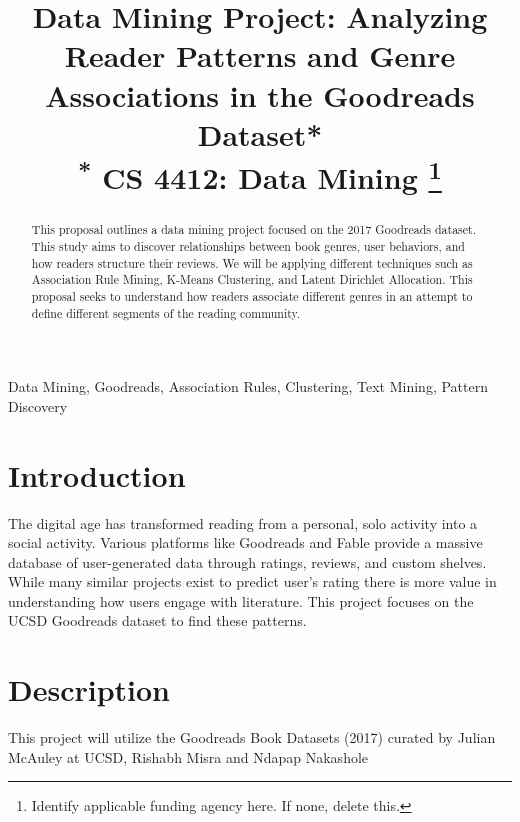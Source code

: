 \documentclass[conference]{IEEEtran}
\begin{document}
\title{Data Mining Project: Analyzing Reader Patterns and Genre Associations in the Goodreads Dataset*\\
{\footnotesize \textsuperscript{*}
CS 4412: Data Mining}
\thanks{Identify applicable funding agency here. If none, delete this.}
}

\author{

}



\begin{abstract}
This proposal outlines a data mining project focused on the 2017 Goodreads dataset. This study aims to discover relationships between book genres, user behaviors, and how readers structure their reviews. We will be applying different techniques such as Association Rule Mining, K-Means Clustering, and Latent Dirichlet Allocation. This proposal seeks to understand how readers associate different genres in an attempt to define different segments of the reading community.
\end{abstract}

\begin{IEEEkeywords}
Data Mining, Goodreads, Association Rules, Clustering, Text Mining, Pattern Discovery
\end{IEEEkeywords}

\section{Introduction}
The digital age has transformed reading from a personal, solo activity into a social activity. Various platforms like Goodreads and Fable provide a massive database of user-generated data through ratings, reviews, and custom shelves. While many similar projects exist to predict user's rating there is more value in understanding how users engage with literature. This project focuses on the UCSD Goodreads dataset to find these patterns.

\section{Description}
This project will utilize the Goodreads Book Datasets (2017) curated by Julian McAuley at UCSD, Rishabh Misra and Ndapap Nakashole
\end{document}
